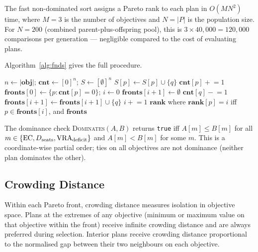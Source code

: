The fast non-dominated sort assigns a Pareto rank to each plan in
$O(M N^2)$ time, where $M = 3$ is the number of objectives and
$N = |P|$ is the population size.
For $N = 200$ (combined parent-plus-offspring pool), this is
$3 \times 40{,}000 = 120{,}000$ comparisons per generation --- negligible
compared to the cost of evaluating plans.

Algorithm~\ref{alg:fnds} gives the full procedure.

\begin{algorithm}[t]
\caption{\textsc{FastNonDominatedSort}($\mathbf{obj}$)}
\label{alg:fnds}
\begin{algorithmic}[1]
\State $n \gets |\mathbf{obj}|$; \quad
  $\mathbf{cnt} \gets [0]^n$; \quad
  $S \gets [\emptyset]^n$
      $S[p] \gets S[p] \cup \{q\}$
      $\mathbf{cnt}[p] \mathrel{+}= 1$
    \EndIf
  \EndFor
\EndFor
\State $\mathbf{fronts}[0] \gets \{p : \mathbf{cnt}[p] = 0\}$; \quad $i \gets 0$
  \State $\mathbf{fronts}[i+1] \gets \emptyset$
      \State $\mathbf{cnt}[q] \mathrel{-}= 1$
        $\mathbf{fronts}[i+1] \gets \mathbf{fronts}[i+1] \cup \{q\}$
      \EndIf
    \EndFor
  \EndFor
  \State $i \mathrel{+}= 1$
\EndWhile
\State \Return $\mathbf{rank}$ where $\mathbf{rank}[p] = i$ iff $p \in \mathbf{fronts}[i]$,
  and $\mathbf{fronts}$
\end{algorithmic}
\end{algorithm}

The dominance check \textsc{Dominates}$(A, B)$ returns \texttt{true} iff
$A[m] \leq B[m]$ for all $m \in \{\mathrm{EC}, D_{\mathrm{seats}}, \mathrm{VRA}_{\mathrm{deficit}}\}$ and
$A[m] < B[m]$ for some $m$.
This is a coordinate-wise partial order; ties on all objectives are not
dominance (neither plan dominates the other).

\subsection{Crowding Distance}

Within each Pareto front, crowding distance measures isolation in objective
space.
Plans at the extremes of any objective (minimum or maximum value on that
objective within the front) receive infinite crowding distance and are
always preferred during selection.
Interior plans receive crowding distance proportional to the normalised gap
between their two neighbours on each objective.

